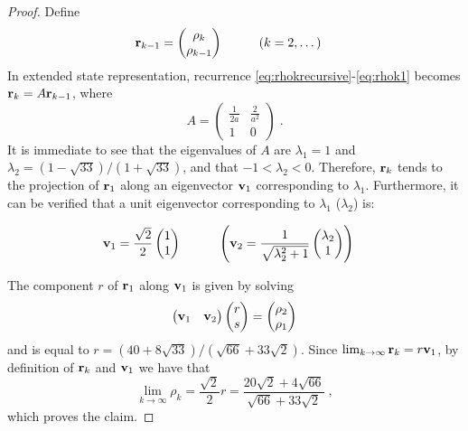 \begin{proof}
	Define
	\begin{alignat*}{2}
	\mathbf{r}_{k-1} & = 
	\begin{pmatrix}
	\rho_k \\
	\rho_{k-1}
	\end{pmatrix} &\qquad&
	(k = 2, \dots )
	\end{alignat*}
	In extended state representation, 
	recurrence \eqref{eq:rhokrecursive}-\eqref{eq:rhok1}
	becomes $\mathbf{r}_k = A \mathbf{r}_{k-1}$, where
	$$A = 
	\begin{pmatrix}
	\frac{1}{2 a} & \frac{2}{a^2} \\
	1             & 0 
	\end{pmatrix}\;.$$
	It is immediate to see
	that the eigenvalues of $A$ are $\lambda_1 = 1$ and 
	$\lambda_2 = (1 - \sqrt{33}) / (1 + \sqrt{33})$, and that
	$-1 < \lambda_2 < 0$.
	Therefore, $\mathbf{r}_k$ tends to the projection of $\mathbf{r}_1$ along an eigenvector 
	$\mathbf{v}_1$ corresponding to $\lambda_1$.
	Furthermore,
	it can be verified that a unit eigenvector corresponding to $\lambda_1$ ($\lambda_2$) is:
	
	\begin{alignat*}{2}
	\mathbf{v}_1 & = 
	\frac{\sqrt{2}}{2}
	\begin{pmatrix}
	1\\
	1
	\end{pmatrix} 
	& \qquad &
	\left(
	\mathbf{v}_2 = 
	\frac{1}{\sqrt{\lambda_2^2+1}}
	\begin{pmatrix}
	\lambda_2\\
	1
	\end{pmatrix}
	\right)
	\end{alignat*}
	
	The component $r$ of $\mathbf{r}_1$ along $\mathbf{v}_1$ is given by solving 
	$$\begin{pmatrix}
	\mathbf{v}_1 & \mathbf{v}_2   
	\end{pmatrix} 
	\begin{pmatrix}
	r\\
	s   
	\end{pmatrix} = 
	\begin{pmatrix}
	\rho_2\\
	\rho_1
	\end{pmatrix}
	$$
	and is equal to
	$r = (40 + 8 \sqrt{33})/(\sqrt{66} + 33 \sqrt{2})$.
	Since $\lim_{k\rightarrow \infty} \mathbf{r}_k = r \mathbf{v}_1$, 
	by definition of $\mathbf{r}_k$ and $\mathbf{v}_1$ we have that
	$$\lim_{k\rightarrow \infty} \rho_k = \frac{\sqrt{2}}{2} r = 
	\frac{20 \sqrt{2} + 4 \sqrt{66}}{\sqrt{66} + 33 \sqrt{2}}\;,$$
	which proves the claim.
\end{proof}

